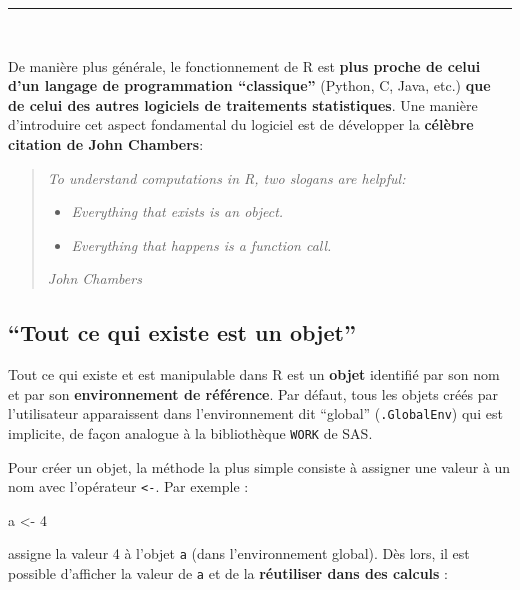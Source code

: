 \documentclass[12pt,twosided, notitlepage]{book}
\newenvironment{Shaded}{}{}
\newcommand{\DecValTok}[1]{#1}
\newcommand{\StringTok}[1]{\textcolor[rgb]{0.00,0.50,0.50}{#1}}
\newcommand{\NormalTok}[1]{#1}
\renewenvironment{Shaded}{\begin{snugshade}}{\end{snugshade}}
\begin{document}
\begin{center}\rule{0.5\linewidth}{\linethickness}\end{center}

~

De manière plus générale, le fonctionnement de R est \textbf{plus proche
de celui d'un langage de programmation \enquote{classique}} (Python, C,
Java, etc.) \textbf{que de celui des autres logiciels de traitements
statistiques}. Une manière d'introduire cet aspect fondamental du
logiciel est de développer la \textbf{célèbre citation de John
Chambers}:

\begin{quote}
\emph{To understand computations in R, two slogans are helpful:}

\begin{itemize}
\item
  \emph{Everything that exists is an object.}
\item
  \emph{Everything that happens is a function call.}
\end{itemize}

\emph{John Chambers}
\end{quote}

\subsection{\texorpdfstring{\enquote{Tout ce qui existe est un
objet}}{Tout ce qui existe est un objet}}\label{tout-ce-qui-existe-est-un-objet}

Tout ce qui existe et est manipulable dans R est un \textbf{objet}
identifié par son nom et par son \textbf{environnement de référence}.
Par défaut, tous les objets créés par l'utilisateur apparaissent dans
l'environnement dit \enquote{global} (\texttt{.GlobalEnv}) qui est
implicite, de façon analogue à la bibliothèque \texttt{WORK} de SAS.

Pour créer un objet, la méthode la plus simple consiste à assigner une
valeur à un nom avec l'opérateur
\texttt{\textless{}-}. Par exemple :

\begin{Shaded}
\begin{Highlighting}[]
\NormalTok{a <-}\StringTok{ }\DecValTok{4}
\end{Highlighting}
\end{Shaded}

assigne la valeur 4 à l'objet \texttt{a} (dans l'environnement global).
Dès lors, il est possible d'afficher la valeur de \texttt{a} et de la
\textbf{réutiliser dans des calculs} :
\end{document}
